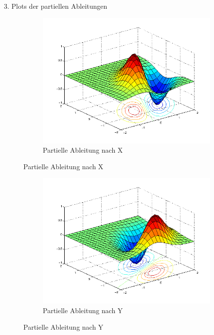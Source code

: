 \documentclass{article}
\begin{document}
	 	3. Plots der partiellen Ableitungen
		\begin{figure}[H]
		  \begin{subfigure}
		    \centering
		    \includegraphics[scale=0.5,bb=0 0 576 432]{task3-f2-derivatedX.png}
			\caption{Partielle Ableitung nach X}
		  \end{subfigure}
		\end{figure}
		\begin{figure}[H]
		  \begin{subfigure}
		    \centering
		    \includegraphics[scale=0.5,bb=0 0 576 432]{task3-f2-derivatedY.png}
			\caption{Partielle Ableitung nach Y}
		  \end{subfigure}
		\end{figure}
		
\end{document}
